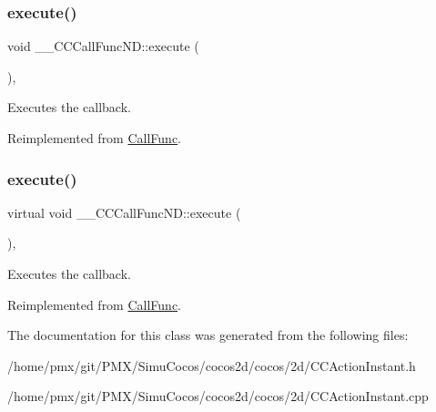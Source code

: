 \subsubsection{\texorpdfstring{execute()}{execute()}\hspace{0.1cm}{\footnotesize\ttfamily [1/2]}}
{\footnotesize\ttfamily void \+\_\+\+\_\+\+C\+C\+Call\+Func\+N\+D\+::execute (\begin{DoxyParamCaption}{ }\end{DoxyParamCaption})\hspace{0.3cm}{\ttfamily [override]}, {\ttfamily [virtual]}}

Executes the callback. 

Reimplemented from \hyperlink{classCallFunc_a9a66dcb09103983ddab2ee2c89ae5c0e}{Call\+Func}.

\mbox{\label{class____CCCallFuncND_a9e3c2cd81860d951e9a83ce29cc40f38}} 
\subsubsection{\texorpdfstring{execute()}{execute()}\hspace{0.1cm}{\footnotesize\ttfamily [2/2]}}
{\footnotesize\ttfamily virtual void \+\_\+\+\_\+\+C\+C\+Call\+Func\+N\+D\+::execute (\begin{DoxyParamCaption}{ }\end{DoxyParamCaption})\hspace{0.3cm}{\ttfamily [override]}, {\ttfamily [virtual]}}

Executes the callback. 

Reimplemented from \hyperlink{classCallFunc_a9a66dcb09103983ddab2ee2c89ae5c0e}{Call\+Func}.



The documentation for this class was generated from the following files\+:\begin{DoxyCompactItemize}
\item 
/home/pmx/git/\+P\+M\+X/\+Simu\+Cocos/cocos2d/cocos/2d/C\+C\+Action\+Instant.\+h\item 
/home/pmx/git/\+P\+M\+X/\+Simu\+Cocos/cocos2d/cocos/2d/C\+C\+Action\+Instant.\+cpp\end{DoxyCompactItemize}
